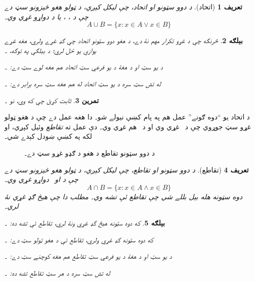 \documentclass[12pt,a4paper,oneside]{report}
\newcommand{\Setabs}[2]{\{#1 : #2\}}
\newcommand{\ollabel}[1]{\label{\pspart:\pschapter:\pssection:#1}}
\newlength{\olphotowidth}
\newcommand{\olasset}[2][\olphotowidth]{\centering\begin{LTR}\centering\resizebox{#1}{!}{}\end{LTR}}
\newenvironment{explain}{}{}
\newtheorem{defn}{تعريف}[section]
\newtheorem{ex}[defn]{بېلګه}
\newtheorem{prob}[defn]{تمرين}
\begin{document}
\begin{defn}[اتحاد]
د دوو سټونو  او  \emph{اتحاد}، چې  ليکل کېږي، د ټولو هغو څيزونو سټ دے چې د ، ، يا د دواړو غړي وي۔
\[
A \cup B = \Setabs{x}{x \in A \lor x \in B}
\]
\end{defn}

\begin{ex}
څرنګه چې د غړو تکرار مهم نۀ دے، د هغو دوو سټونو اتحاد چې ګډ غړے ولري، هغه غړے يوازې يو ځل لري؛ د بېلګې په توګه، ۔

د يو سټ او د هغۀ د يو فرعي سټ اتحاد هم هغه لوے سټ دے: ۔

له تش سټ سره د يو سټ اتحاد له هم هغه سټ سره برابر دے: ۔
\end{ex}

\begin{prob}
ثابت کړئ چې که  وي، نو ۔
\end{prob}

\begin{explain}
د اتحاد يو ``دوه ګونے'' عمل هم په پام کښې نيولے شو۔ دا هغه عمل دے چې د هغو ټولو غړو سټ جوړوي چې د~ غړي وي او د~ هم غړي وي۔ دې عمل ته \emph{تقاطع} وئيل کېږي، او لکه په  کښې ښودل کېدے شي۔
\begin{figure}
  \olasset{assets/diagrams/intersection.tikz}
  \caption{د دوو سټونو تقاطع  د هغو د ګډو غړو سټ دے۔}
  \ollabel{fig:intersection}
\end{figure}
\end{explain}

\begin{defn}[تقاطع]
د دوو سټونو  او  \emph{تقاطع}، چې  ليکل کېږي، د ټولو هغو څيزونو سټ دے چې د  او~ دواړو غړي وي۔
\[
A \cap B = \Setabs{x}{x \in A \land x \in B}
\]
دوه سټونه هله \emph{بېل} بللے شي چې تقاطع ئې تشه وي۔ مطلب دا چې هېڅ ګډ غړي نۀ لري۔
\end{defn}

\begin{ex}
که دوه سټونه هېڅ ګډ غړي ونۀ لري، تقاطع ئې تشه ده: ۔

که دوه سټونه ګډ غړي ولري، تقاطع ئې د هغو ټولو سټ دے: ۔

د يو سټ او د هغۀ د يو فرعي سټ تقاطع هم هغه کوچنے سټ دے: ۔

له تش سټ سره د هر سټ تقاطع تشه ده: ۔
\end{ex}
\end{document}
